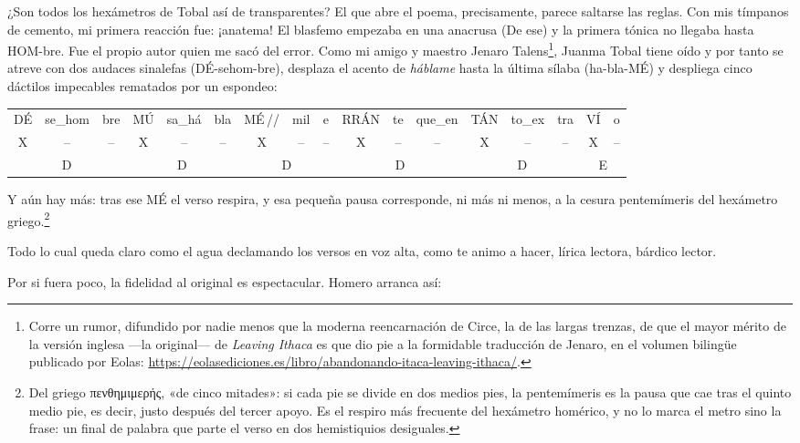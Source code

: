 \documentclass[11pt,a4paper]{article}
\newcommand{\gr}[1]{\foreignlanguage{greek}{#1}}
\begin{document}
¿Son todos los hexámetros de Tobal así de transparentes? El que abre el poema, precisamente, parece saltarse las reglas. Con mis tímpanos de cemento, mi primera reacción fue: ¡anatema! El blasfemo empezaba en una anacrusa (De ese) y la primera tónica no llegaba hasta HOM-bre. Fue el propio autor quien me sacó del error. Como mi amigo y maestro Jenaro Talens\footnote{Corre un rumor, difundido por nadie menos que la moderna reencarnación de Circe, la de las largas trenzas, de que el mayor mérito de la versión inglesa ---la original--- de \emph{Leaving Ithaca} es que dio pie a la formidable traducción de Jenaro, en el volumen bilingüe publicado por Eolas: \url{https://eolasediciones.es/libro/abandonando-itaca-leaving-ithaca/}.}, Juanma Tobal tiene oído y por tanto se atreve con dos audaces sinalefas (DÉ-sehom-bre), desplaza el acento de \emph{háblame} hasta la última sílaba (ha-bla-MÉ) y despliega cinco dáctilos impecables rematados por un espondeo:

\begin{center}
\small\setlength{\tabcolsep}{3pt}
\begin{tabular}{ccc|ccc|ccc|ccc|ccc|cc}
DÉ & se\_hom & bre & MÚ & sa\_há & bla & MÉ\,// & mil & e & RRÁN & te & que\_en & TÁN & to\_ex & tra & VÍ & o \\
X & -- & -- & X & -- & -- & X & -- & -- & X & -- & -- & X & -- & -- & X & -- \\
\multicolumn{3}{c|}{D} & \multicolumn{3}{c|}{D} & \multicolumn{3}{c|}{D} & \multicolumn{3}{c|}{D} & \multicolumn{3}{c|}{D} & \multicolumn{2}{c}{E} \\
\end{tabular}
\end{center}

Y aún hay más: tras ese MÉ el verso respira, y esa pequeña pausa corresponde, ni más ni menos, a la cesura pentemímeris del hexámetro griego.\footnote{Del griego \gr{πενθημιμερής}, «de cinco mitades»: si cada pie se divide en dos medios pies, la pentemímeris es la pausa que cae tras el quinto medio pie, es decir, justo después del tercer apoyo. Es el respiro más frecuente del hexámetro homérico, y no lo marca el metro sino la frase: un final de palabra que parte el verso en dos hemistiquios desiguales.} 

Todo lo cual queda claro como el agua declamando los versos en voz alta, como te animo a hacer, lírica lectora, bárdico lector. 

Por si fuera poco, la fidelidad al original es espectacular. Homero arranca así:
\end{document}
